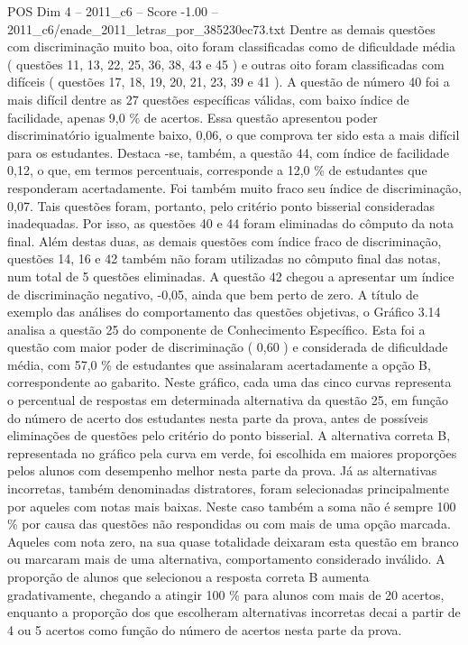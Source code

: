 \begin{textsample}{POS Dim 4 – 2011\_c6 – Score -1.00 – 2011\_c6/enade\_2011\_letras\_por\_385230ec73.txt}
Dentre as demais questões com discriminação muito boa, oito foram classificadas como de dificuldade média ( questões 11, 13, 22, 25, 36, 38, 43 e 45 ) e outras oito foram classificadas com difíceis ( questões 17, 18, 19, 20, 21, 23, 39 e 41 ).
A questão de número 40 foi a mais difícil dentre as 27 questões específicas válidas, com baixo índice de facilidade, apenas 9,0 \% de acertos.
Essa questão apresentou poder discriminatório igualmente baixo, 0,06, o que comprova ter sido esta a mais difícil para os estudantes.
Destaca -se, também, a questão 44, com índice de facilidade 0,12, o que, em termos percentuais, corresponde a 12,0 \% de estudantes que responderam acertadamente.
Foi também muito fraco seu índice de discriminação, 0,07.
Tais questões foram, portanto, pelo critério ponto bisserial consideradas inadequadas.
Por isso, as questões 40 e 44 foram eliminadas do cômputo da nota final.
Além destas duas, as demais questões com índice fraco de discriminação, questões 14, 16 e 42 também não foram utilizadas no cômputo final das notas, num total de 5 questões eliminadas.
A questão 42 chegou a apresentar um índice de discriminação negativo, -0,05, ainda que bem perto de zero.
A título de exemplo das análises do comportamento das questões objetivas, o Gráfico 3.14 analisa a questão 25 do componente de Conhecimento Específico.
Esta foi a questão com maior poder de discriminação ( 0,60 ) e considerada de dificuldade média, com 57,0 \% de estudantes que assinalaram acertadamente a opção B, correspondente ao gabarito.
Neste gráfico, cada uma das cinco curvas representa o percentual de respostas em determinada alternativa da questão 25, em função do número de acerto dos estudantes nesta parte da prova, antes de possíveis eliminações de questões pelo critério do ponto bisserial.
A alternativa correta B, representada no gráfico pela curva em verde, foi escolhida em maiores proporções pelos alunos com desempenho melhor nesta parte da prova.
Já as alternativas incorretas, também denominadas distratores, foram selecionadas principalmente por aqueles com notas mais baixas.
Neste caso também a soma não é sempre 100 \% por causa das questões não respondidas ou com mais de uma opção marcada.
Aqueles com nota zero, na sua quase totalidade deixaram esta questão em branco ou marcaram mais de uma alternativa, comportamento considerado inválido.
A proporção de alunos que selecionou a resposta correta B aumenta gradativamente, chegando a atingir 100 \% para alunos com mais de 20 acertos, enquanto a proporção dos que escolheram alternativas incorretas decai a partir de 4 ou 5 acertos como função do número de acertos nesta parte da prova.

\end{textsample}
